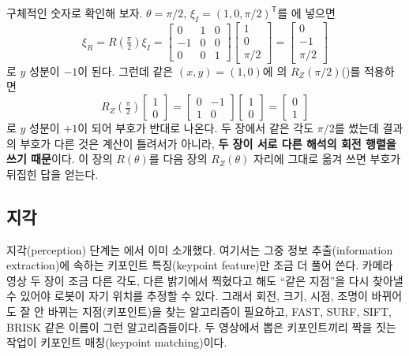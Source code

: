 구체적인 숫자로 확인해 보자. $\theta = \pi/2$, $\xi_I = (1, 0, \pi/2)^{\mathsf{T}}$를
에 넣으면
\[
  \xi_R = R\!\left(\tfrac{\pi}{2}\right)\xi_I
        = \begin{bmatrix} 0 & 1 & 0 \\ -1 & 0 & 0 \\ 0 & 0 & 1 \end{bmatrix}
          \begin{bmatrix} 1 \\ 0 \\ \pi/2 \end{bmatrix}
        = \begin{bmatrix} 0 \\ -1 \\ \pi/2 \end{bmatrix}
\]
로 $y$ 성분이 $-1$이 된다. 그런데 같은 $(x,y)=(1,0)$에 의
$R_Z(\pi/2)$()를 적용하면
\[
  R_Z\!\left(\tfrac{\pi}{2}\right)\begin{bmatrix}1\\0\end{bmatrix}
  = \begin{bmatrix}0&-1\\1&0\end{bmatrix}\begin{bmatrix}1\\0\end{bmatrix}
  = \begin{bmatrix}0\\1\end{bmatrix}
\]
로 $y$ 성분이 $+1$이 되어 부호가 반대로 나온다. 두 장에서 같은 각도
$\pi/2$를 썼는데 결과의 부호가 다른 것은 계산이 틀려서가 아니라, \textbf{두
장이 서로 다른 해석의 회전 행렬을 쓰기 때문}이다. 이 장의 $R(\theta)$를
다음 장의 $R_Z(\theta)$ 자리에 그대로 옮겨 쓰면 부호가 뒤집힌 답을 얻는다.

\subsection{지각}
\label{sec:lec01-perception}

지각(perception) 단계는 에서 이미 소개했다. 여기서는
그중 정보 추출(information extraction)에 속하는 키포인트 특징(keypoint
feature)만 조금 더 풀어 쓴다. 카메라 영상 두 장이 조금 다른 각도, 다른
밝기에서 찍혔다고 해도 ``같은 지점''을 다시 찾아낼 수 있어야 로봇이 자기
위치를 추정할 수 있다. 그래서 회전, 크기, 시점, 조명이 바뀌어도 잘 안
바뀌는 지점(키포인트)을 찾는 알고리즘이 필요하고, FAST, SURF, SIFT, BRISK
같은 이름이 그런 알고리즘들이다. 두 영상에서 뽑은 키포인트끼리 짝을 짓는
작업이 키포인트 매칭(keypoint matching)이다.

